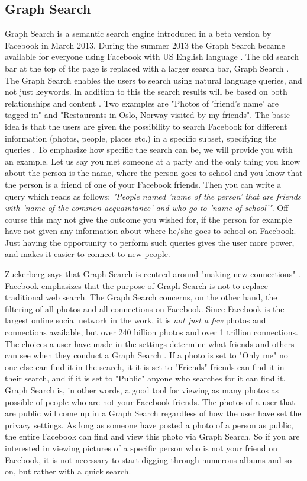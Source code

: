 \subsection{Graph Search}
Graph Search is a semantic search engine introduced in a beta version by Facebook in March 2013. During the summer 2013 the Graph Search became available for everyone using Facebook with US English language \cite{graphsearchnet}. The old search bar at the top of the page is replaced with a larger search bar, Graph Search \cite{graphsearchfb}. The Graph Search enables the users to search using natural language queries, and not just keywords. In addition to this the search results will be based on both relationships and content \citep{graphsearchnet}. Two examples are "Photos of 'friend's name' are tagged in" and "Restaurants in Oslo, Norway visited by my friends". The basic idea is that the users are given the possibility to search Facebook for different information (photos, people, places etc.) in a specific subset, specifying the queries \cite{graphsearchew}. To emphasize how specific the search can be, we will provide you with an example. Let us say you met someone at a party and the only thing you know about the person is the name, where the person goes to school and you know that the person is a friend of one of your Facebook friends. Then you can write a query which reads as follows: \textit{"People named 'name of the person' that are friends with 'name of the common acquaintance' and who go to 'name of school'"}. Off course this may not give the outcome you wished for, if the person for example have not given any information about where he/she goes to school on Facebook. Just having the opportunity to perform such queries gives the user more power, and makes it easier to connect to new people. 

Zuckerberg says that Graph Search is centred around "making new connections" \cite{graphsearchew}. Facebook emphasizes that the purpose of Graph Search is not to replace traditional web search. The Graph Search concerns, on the other hand, the filtering of all photos and all connections on Facebook. Since Facebook is the largest online social network in the work, it is \textit{not just a few} photos and connections available, but over 240 billion photos and over 1 trillion connections. The choices a user have made in the settings determine what friends and others can see when they conduct a Graph Search \cite{graphsearchtips}. If a photo is set to "Only me" no one else can find it in the search, it it is set to "Friends" friends can find it in their search, and if it is set to "Public" anyone who searches for it can find it. Graph Search is, in other words, a good tool for viewing as many photos as possible of people who are not your Facebook friends. The photos of a user that are public will come up in a Graph Search regardless of how the user have set the privacy settings. As long as someone have posted a photo of a person as public, the entire Facebook can find and view this photo via Graph Search. So if you are interested in viewing pictures of a specific person who is not your friend on Facebook, it is not necessary to start digging through numerous albums and so on, but rather with a quick search. 

